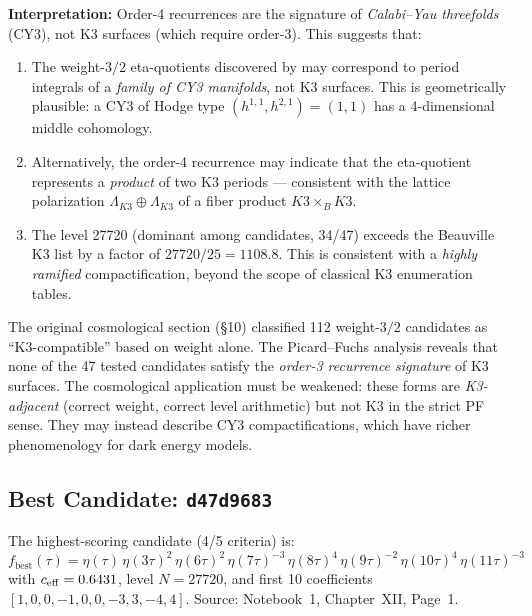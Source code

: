\textbf{Interpretation:} Order-4 recurrences are the signature of \emph{Calabi--Yau threefolds} (CY3),
not K3 surfaces (which require order-3). This suggests that:
\begin{enumerate}
  \item The weight-$3/2$ eta-quotients discovered by \RAMA{} may correspond to period integrals
        of a \emph{family of CY3 manifolds}, not K3 surfaces. This is geometrically plausible:
        a CY3 of Hodge type $(h^{1,1}, h^{2,1}) = (1, 1)$ has a 4-dimensional middle cohomology.
  \item Alternatively, the order-4 recurrence may indicate that the eta-quotient represents
        a \emph{product} of two K3 periods --- consistent with the lattice polarization
        $\Lambda_{K3} \oplus \Lambda_{K3}$ of a fiber product $K3 \times_B K3$.
  \item The level 27720 (dominant among candidates, 34/47) exceeds the Beauville K3 list by
        a factor of $27720/25 = 1108.8$. This is consistent with a \emph{highly ramified}
        compactification, beyond the scope of classical K3 enumeration tables.
\end{enumerate}

\begin{remark}
The original cosmological section (§10) classified 112 weight-$3/2$ candidates as ``K3-compatible''
based on weight alone. The Picard--Fuchs analysis reveals that none of the 47 tested candidates
satisfy the \emph{order-3 recurrence signature} of K3 surfaces. The cosmological application
must be weakened: these forms are \emph{K3-adjacent} (correct weight, correct level arithmetic)
but not K3 in the strict PF sense. They may instead describe CY3 compactifications,
which have richer phenomenology for dark energy models.
\end{remark}

\subsection{Best Candidate: \texttt{d47d9683}}

The highest-scoring candidate (4/5 criteria) is:
\begin{equation}
  f_{\mathrm{best}}(\tau) = \eta(\tau)\,\eta(3\tau)^2\,\eta(6\tau)^2\,\eta(7\tau)^{-3}\,\eta(8\tau)^4\,\eta(9\tau)^{-2}\,\eta(10\tau)^4\,\eta(11\tau)^{-3}
\end{equation}
with $c_{\mathrm{eff}} = 0.6431$, level $N = 27720$, and first 10 coefficients
$[1, 0, 0, -1, 0, 0, -3, 3, -4, 4]$.
Source: Notebook~1, Chapter~XII, Page~1.

